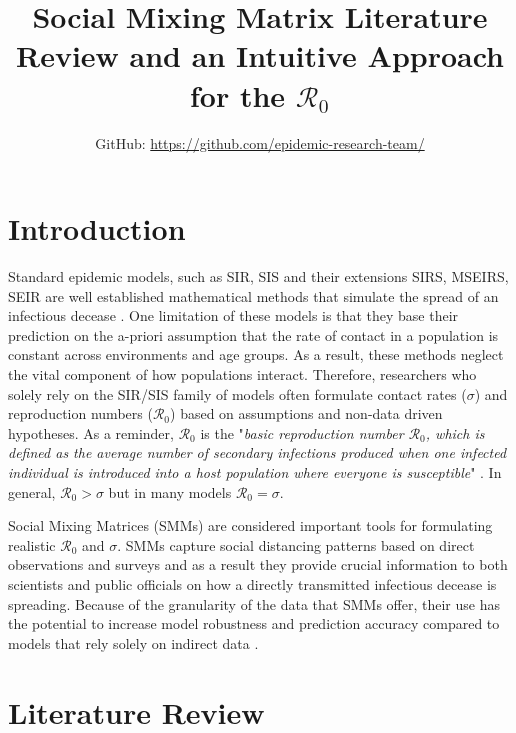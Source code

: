 \documentclass[12pt]{article}
\title{Social Mixing Matrix Literature Review and an Intuitive Approach for the $\mathcal{R}_{0}$}
\author{GitHub: \url{https://github.com/epidemic-research-team/}}
\begin{document}
\maketitle

\section{Introduction}

Standard epidemic models, such as SIR, SIS and their extensions  SIRS, MSEIRS, SEIR are well established mathematical methods that simulate the spread of an infectious decease \cite{keeling2008modeling, ma2009mathematical, li2018introduction}. One limitation of these models is that they base their prediction on the a-priori assumption that the rate of contact in a population is constant across environments and age groups. As a result, these methods neglect the vital component of how populations interact. Therefore, researchers who solely rely on the SIR/SIS family of models often formulate contact rates ($\sigma$) and reproduction numbers ($\mathcal{R}_{0} $) based on assumptions and non-data driven hypotheses. As a reminder, $\mathcal{R}_{0} $ is the "\textit{basic reproduction number $\mathcal{R}_{0}$, which is defined as the average number of secondary infections produced when one infected individual is introduced into a host population where everyone is susceptible}" \cite[p.21]{ma2009mathematical}. In general, $\mathcal{R}_{0} >\sigma$ but in many models $\mathcal{R}_{0} =\sigma$. 

Social Mixing Matrices (SMMs) are considered important tools for formulating realistic $\mathcal{R_{0}}$ and $\sigma$. SMMs capture social distancing patterns based on direct observations and surveys and as a result they provide crucial information to both scientists and public officials on how a directly transmitted infectious decease is spreading. Because of the granularity of the data that SMMs offer, their use has the potential to increase model robustness and prediction accuracy compared to models that rely solely on indirect data \cite{Mossong:2008, Baguelin:2013}. 

\section{Literature Review}
\end{document}
